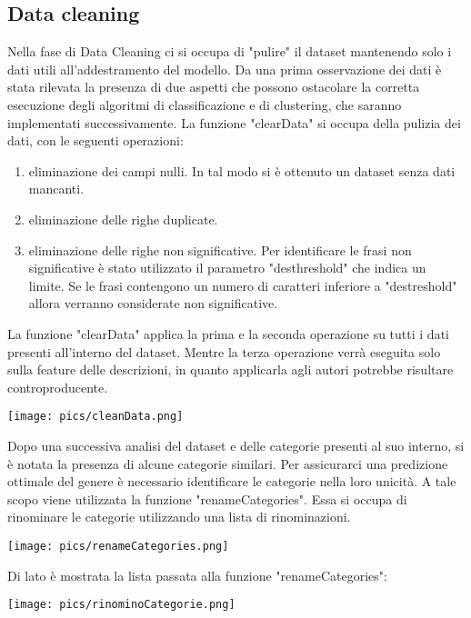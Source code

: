 \documentclass[12pt,oneside]{article}
\begin{document}
    \begin{enumerate}
    \subsection{Data cleaning}
    \begin{justify}
    Nella fase di Data Cleaning ci si occupa di "pulire" il dataset mantenendo solo i dati utili all'addestramento del modello. Da una prima osservazione dei dati è stata rilevata la presenza di due aspetti che possono ostacolare la corretta esecuzione degli algoritmi di classificazione e di clustering, che saranno implementati successivamente. La funzione "clearData" si occupa della pulizia dei dati, con le seguenti operazioni: 
    \begin{enumerate}[label=\arabic*)]
        \item eliminazione dei campi nulli. In tal modo si è ottenuto un dataset senza dati mancanti.
        \item eliminazione delle righe duplicate.
        \item eliminazione delle righe non significative. Per identificare le frasi non significative è stato utilizzato il parametro "des\textunderscore{}threshold" che indica un limite. Se le frasi contengono un numero di caratteri inferiore a "des\textunderscore{}treshold" allora verranno considerate non significative.
    \end{enumerate}
    La funzione "clearData" applica la prima e la seconda operazione su tutti i dati presenti all'interno del dataset. Mentre la terza operazione verrà eseguita solo sulla feature delle descrizioni, in quanto applicarla agli autori potrebbe risultare controproducente. 
    \end{justify}
    \texttt{[image: pics/cleanData.png]}
    
    \newpage
    \begin{justify}
    Dopo una successiva analisi del dataset e delle categorie presenti al suo interno, si è notata la presenza di alcune categorie similari. Per assicurarci una predizione ottimale del genere è necessario identificare le categorie nella loro unicità. A tale scopo viene utilizzata la funzione "renameCategories". Essa si occupa di rinominare le categorie utilizzando una lista di rinominazioni.
    \end{justify}

    \texttt{[image: pics/renameCategories.png]}

    \begin{minipage}[t]{0.39\textwidth}
    \vspace{30pt}
    Di lato è mostrata la lista passata alla funzione "renameCategories":
    \end{minipage}
    \hfill
    \begin{minipage}[t]{0.50\textwidth}
    \vspace{20pt}
    \texttt{[image: pics/rinominoCategorie.png]}
    \end{minipage}
    

\end{enumerate}
\end{document}
